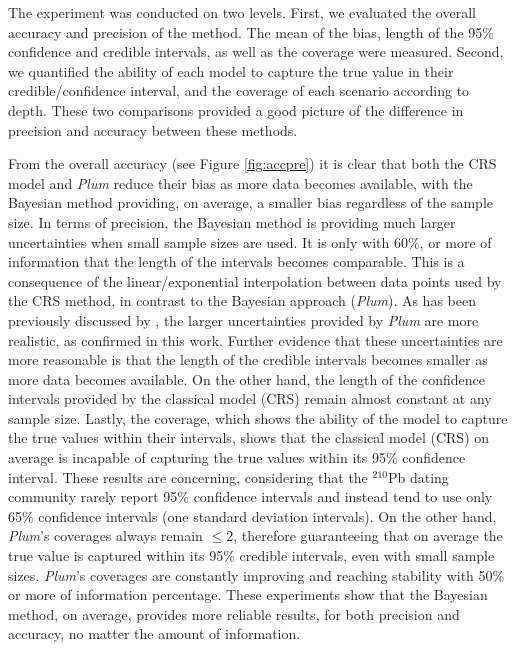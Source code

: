 \documentclass [10pt] {article}
\begin{document}
The experiment was conducted on two levels.
First, we evaluated the overall accuracy and precision of the method.
The mean of the bias, length of the 95\% confidence and credible intervals, as well as the coverage were measured.
Second, we quantified the ability of each model to capture the true value in their credible/confidence interval, and the coverage of each scenario according to depth. 
These two comparisons provided a good picture of the difference in precision and accuracy between these methods.

From the overall accuracy (see Figure \ref{fig:accpre}) it is clear that both the CRS model and \textit{Plum} reduce their bias as more data becomes available, with the Bayesian method providing, on average, a smaller bias regardless of the sample size. 
In terms of precision, the Bayesian method is providing much larger uncertainties when small sample sizes are used. 
It is only with 60\%, or more of information that the length of the intervals becomes comparable. 
This is a consequence of the linear/exponential interpolation between data points used by the CRS method, in contrast to the Bayesian approach (\textit{Plum}).  
As has been previously discussed by \citet{Aquino2020}, the larger uncertainties provided by \textit{Plum} are more realistic, as confirmed in this work.
Further evidence that these uncertainties are more reasonable is that the length of the credible intervals becomes smaller as more data becomes available. 
On the other hand, the length of the confidence intervals provided by the classical model (CRS) remain almost constant at any sample size.
Lastly, the coverage, which shows the ability of the model to capture the true values within their intervals, shows that the classical model (CRS) on average is incapable of capturing the true values within its 95\% confidence interval. 
These results are concerning, considering that the $^{210}$Pb dating community rarely report 95\% confidence intervals and instead tend to use only 65\% confidence intervals (one standard deviation intervals).
On the other hand, \textit{Plum}'s coverages always remain $\leq 2$, therefore guaranteeing that on average the true value is captured within its 95\% credible intervals, even with small sample sizes.
\textit{Plum}'s coverages are constantly improving and reaching stability with 50\% or more of information percentage.
These experiments show that the Bayesian method, on average, provides more reliable results, for both precision and accuracy, no matter the amount of information.
\end{document}
